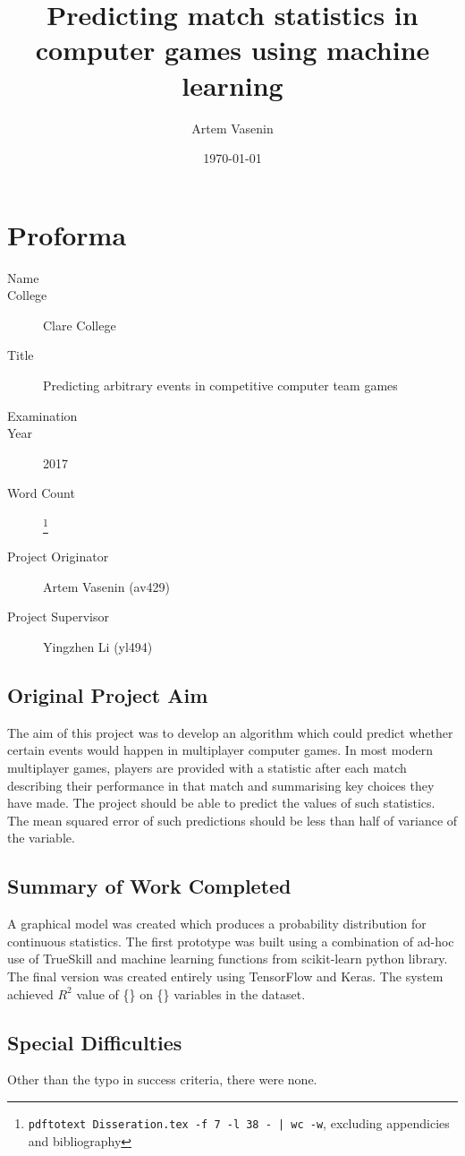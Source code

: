 \documentclass[12pt,a4paper]{book}
\title{Predicting match statistics in computer games using machine learning}
\author{Artem Vasenin}
\date{\today}
\newcommand\college{Clare College}
\begin{document}
\frontmatter
\maketitle

\section*{Proforma}
\begin{description}
\item[Name] \theauthor
\item[College] \college
\item[Title] Predicting arbitrary events in competitive computer team games
\item[Examination] %
\item[Year] 2017
\item[Word Count] \footnote{ \lstinline+pdftotext Disseration.tex -f 7 -l 38 - | wc -w+,  excluding appendicies and bibliography} %
\item[Project Originator] Artem Vasenin (av429)
\item[Project Supervisor] Yingzhen Li (yl494)
\end{description}

\subsection*{Original Project Aim}
The aim of this project was to develop an algorithm which could predict whether certain events would happen in multiplayer computer games.
In most modern multiplayer games, players are provided with a statistic after each match describing their performance in that match and summarising key choices they have made.
The project should be able to predict the values of such statistics.
The mean squared error of such predictions should be less than half of variance of the variable.
\subsection*{Summary of Work Completed}
A graphical model was created which produces a probability distribution for continuous statistics.
The first prototype was built using a combination of ad-hoc use of TrueSkill and machine learning functions from scikit-learn python library.
The final version was created entirely using TensorFlow and Keras.
The system achieved $R^2$ value of \{\}%
on \{\}%
variables in the dataset.
\subsection*{Special Difficulties}
Other than the typo in success criteria, there were none.
\end{document}
